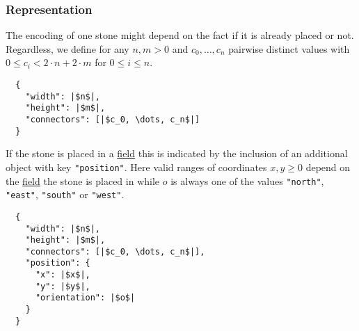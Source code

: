 \documentclass{scrartcl}
\begin{document}
\subsubsection{Representation}
The encoding of one stone might depend on the fact if it is already placed or 
not. Regardless, we define for any $n,m > 0$ and $c_{0}, \dots, c_{n}$ pairwise
distinct values with $0 \leq c_{i} < 2\cdot n + 2\cdot m$ for $0\leq i\leq n$.
\begin{verbatim}
  {
    "width": |$n$|,
    "height": |$m$|,
    "connectors": [|$c_0, \dots, c_n$|]
  }
\end{verbatim}
If the stone is placed in a \hyperlink{field}{field} this is indicated by the 
inclusion of an additional object with key \texttt{"position"}. Here 
valid ranges of coordinates $x, y \geq 0$ depend on the 
\hyperlink{field}{field} the stone is placed in while $o$ is always one of the 
values \texttt{"north"}, \texttt{"east"}, 
\texttt{"south"} or \texttt{"west"}.
\begin{verbatim}
  {
    "width": |$n$|,
    "height": |$m$|,
    "connectors": [|$c_0, \dots, c_n$|],
    "position": {
      "x": |$x$|,
      "y": |$y$|,
      "orientation": |$o$|
    }
  }
\end{verbatim}
\end{document}
